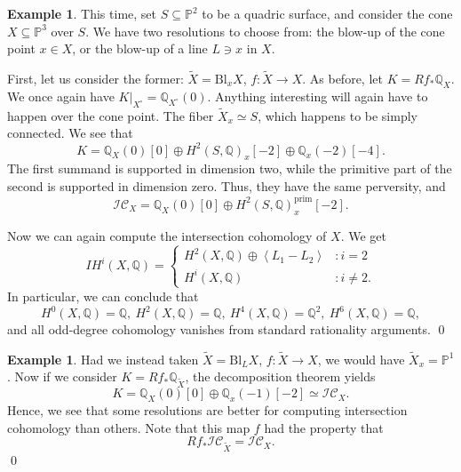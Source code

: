 \documentclass[12pt]{amsart}
\newcommand{\Q}{\mathbb{Q}}
\newcommand{\wt}{\widetilde}
\theoremstyle{definition}
\newtheorem{example}[theorem]{Example}
\theoremstyle{remark}
\numberwithin{equation}{section}
\begin{document}
\begin{example}
This time, set \(S \subseteq \mathbb{P}^2\) to be a quadric surface, and consider
the cone \(X \subseteq \mathbb{P}^3\) over \(S\). We have two resolutions to 
choose from: the blow-up of the cone point \(x \in X\), or the blow-up of a line 
\(L \ni x\) in \(X\).

First, let us consider the former: \(\wt{X} = \mathrm{Bl}_x X\), \(f: \wt{X} \to X\). 
As before, let \(K = Rf_* \Q_X\). We once again have \(K|_{X^\circ} = \Q_{X^\circ}(0)\).
Anything interesting will again have to happen over the cone point. The fiber 
\(\wt{X}_x \simeq S\), which happens to be simply connected. We see that 
\begin{equation}
    K = \Q_X(0)[0] \oplus H^2(S, \Q)_x[-2] \oplus \Q_x(-2)[-4].
\end{equation}
The first summand is supported in dimension two, while the primitive part of the second 
is supported in dimension zero. Thus, they have the same perversity, and 
\begin{equation}
    \mathscr{IC}_X = \Q_X(0)[0] \oplus H^2(S, \Q)_x^{\mathrm{prim}}[-2].
\end{equation}

Now we can again compute the intersection cohomology of \(X\). We get 
\begin{equation}
    IH^i(X, \Q) = \begin{cases}
        H^2(X, \Q) \oplus \left<L_1 - L_2\right> & : i = 2\\
        H^i(X, \Q) & : i \neq 2.
    \end{cases}
\end{equation}
In particular, we can conclude that 
\begin{equation}
    H^0(X, \Q) = \Q,\ H^2(X, \Q) = \Q,\ H^4(X, \Q) = \Q^2,\ H^6(X, \Q) = \Q, 
\end{equation}
and all odd-degree cohomology vanishes from standard rationality arguments.
\qed
\end{example}

\begin{example}
Had we instead taken \(\wt{X} = \mathrm{Bl}_L X\), \(f: \wt{X} \to X\), we would have 
\(\wt{X}_x = \mathbb{P}^1\). Now if we consider \(K = Rf_* \Q_{\wt{X}}\), the 
decomposition theorem yields 
\begin{equation}
    K = \Q_X(0)[0] \oplus \Q_x(-1)[-2] \simeq \mathscr{IC}_X.
\end{equation}
Hence, we see that some resolutions are better for computing intersection cohomology 
than others. Note that this map \(f\) had the property that 
\begin{equation}
    Rf_* \mathscr{IC}_{\wt{X}} = \mathscr{IC}_X.
\end{equation}
\qed
\end{example}







\end{document}
